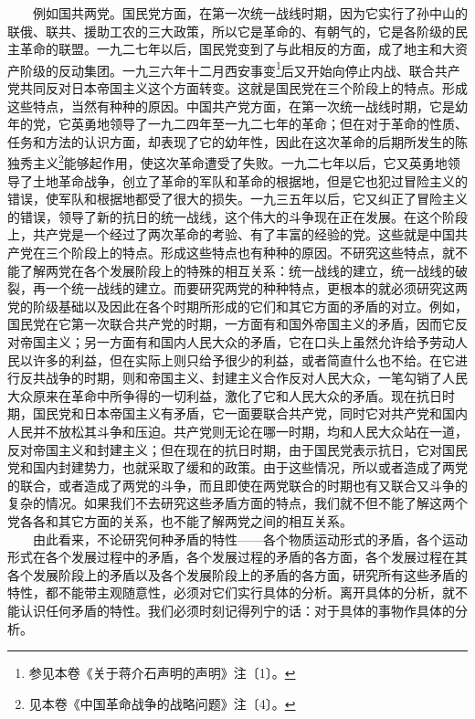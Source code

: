 \documentclass[cn,11pt,chinese]{elegantbook}
\begin{document}
　　例如国共两党。国民党方面，在第一次统一战线时期，因为它实行了孙中山的联俄、联共、援助工农的三大政策，所以它是革命的、有朝气的，它是各阶级的民主革命的联盟。一九二七年以后，国民党变到了与此相反的方面，成了地主和大资产阶级的反动集团。一九三六年十二月西安事变\footnote[19]{ 参见本卷《关于蒋介石声明的声明》注〔1〕。}后又开始向停止内战、联合共产党共同反对日本帝国主义这个方面转变。这就是国民党在三个阶段上的特点。形成这些特点，当然有种种的原因。中国共产党方面，在第一次统一战线时期，它是幼年的党，它英勇地领导了一九二四年至一九二七年的革命；但在对于革命的性质、任务和方法的认识方面，却表现了它的幼年性，因此在这次革命的后期所发生的陈独秀主义\footnote[20]{ 见本卷《中国革命战争的战略问题》注〔4〕。}能够起作用，使这次革命遭受了失败。一九二七年以后，它又英勇地领导了土地革命战争，创立了革命的军队和革命的根据地，但是它也犯过冒险主义的错误，使军队和根据地都受了很大的损失。一九三五年以后，它又纠正了冒险主义的错误，领导了新的抗日的统一战线，这个伟大的斗争现在正在发展。在这个阶段上，共产党是一个经过了两次革命的考验、有了丰富的经验的党。这些就是中国共产党在三个阶段上的特点。形成这些特点也有种种的原因。不研究这些特点，就不能了解两党在各个发展阶段上的特殊的相互关系：统一战线的建立，统一战线的破裂，再一个统一战线的建立。而要研究两党的种种特点，更根本的就必须研究这两党的阶级基础以及因此在各个时期所形成的它们和其它方面的矛盾的对立。例如，国民党在它第一次联合共产党的时期，一方面有和国外帝国主义的矛盾，因而它反对帝国主义；另一方面有和国内人民大众的矛盾，它在口头上虽然允许给予劳动人民以许多的利益，但在实际上则只给予很少的利益，或者简直什么也不给。在它进行反共战争的时期，则和帝国主义、封建主义合作反对人民大众，一笔勾销了人民大众原来在革命中所争得的一切利益，激化了它和人民大众的矛盾。现在抗日时期，国民党和日本帝国主义有矛盾，它一面要联合共产党，同时它对共产党和国内人民并不放松其斗争和压迫。共产党则无论在哪一时期，均和人民大众站在一道，反对帝国主义和封建主义；但在现在的抗日时期，由于国民党表示抗日，它对国民党和国内封建势力，也就采取了缓和的政策。由于这些情况，所以或者造成了两党的联合，或者造成了两党的斗争，而且即使在两党联合的时期也有又联合又斗争的复杂的情况。如果我们不去研究这些矛盾方面的特点，我们就不但不能了解这两个党各各和其它方面的关系，也不能了解两党之间的相互关系。\\
　　由此看来，不论研究何种矛盾的特性——各个物质运动形式的矛盾，各个运动形式在各个发展过程中的矛盾，各个发展过程的矛盾的各方面，各个发展过程在其各个发展阶段上的矛盾以及各个发展阶段上的矛盾的各方面，研究所有这些矛盾的特性，都不能带主观随意性，必须对它们实行具体的分析。离开具体的分析，就不能认识任何矛盾的特性。我们必须时刻记得列宁的话：对于具体的事物作具体的分析。\\
\end{document}
